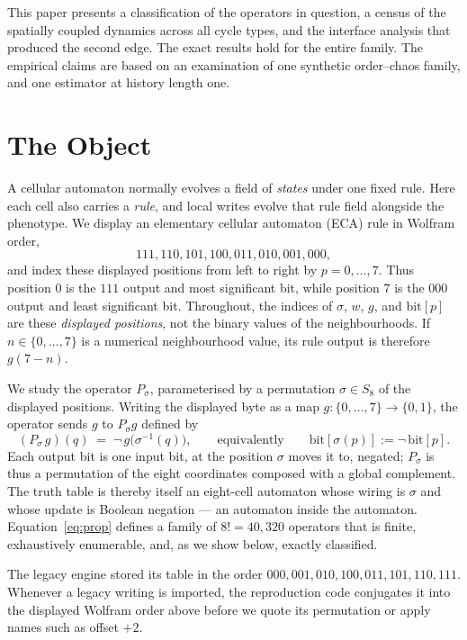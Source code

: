 \documentclass[man,12pt,floatsintext,donotrepeattitle]{apa7}
\newcommand{\sig}{\sigma}
\newcommand{\bit}[1]{\mathrm{bit}[#1]}
\begin{document}
This paper presents a classification of the operators in question, a
census of the spatially coupled dynamics across all cycle types, and
the interface analysis that produced the second edge. The exact
results hold for the entire family. The empirical claims are based on
an examination of one synthetic order--chaos family, and one estimator
at history length one.

\section{The Object}
\label{sec:object}

A cellular automaton normally evolves a field of \emph{states} under one
fixed rule. Here each cell also carries a \emph{rule}, and local writes evolve
that rule field alongside the phenotype. We display an elementary cellular
automaton (ECA) rule in Wolfram order,
\[
111,110,101,100,011,010,001,000,
\]
and index these displayed positions from left to right by $p=0,\ldots,7$.
Thus position $0$ is the $111$ output and most significant bit, while position
$7$ is the $000$ output and least significant bit. Throughout, the indices of
$\sig$, $w$, $g$, and $\bit{p}$ are these \emph{displayed positions}, not the
binary values of the neighbourhoods. If $n\in\{0,\ldots,7\}$ is a numerical
neighbourhood value, its rule output is therefore $g(7-n)$.

We study the operator $P_\sig$, parameterised by a permutation
$\sig\in S_8$ of the displayed positions. Writing the displayed byte as a map
$g\colon\{0,\dots,7\}\to\{0,1\}$, the operator sends $g$ to $P_\sig g$ defined by
\begin{equation}
(P_\sig\, g)(q) \;=\; \lnot\, g\bigl(\sig^{-1}(q)\bigr),
\qquad\text{equivalently}\qquad \bit{\sig(p)} := \lnot\,\bit{p}.
\label{eq:prop}
\end{equation}
Each output bit is one input bit, at the position $\sig$ moves it to, negated;
$P_\sig$ is thus a permutation of the eight coordinates composed with a global
complement. The truth table is thereby itself an eight-cell automaton whose
wiring is $\sig$ and whose update is Boolean negation --- an automaton inside
the automaton. Equation~\eqref{eq:prop} defines a family of $8! = 40{,}320$
operators that is finite, exhaustively enumerable, and, as we show below,
exactly classified.

The legacy engine stored its table in the order
$000,001,010,100,011,101,110,111$. Whenever a legacy writing is imported, the
reproduction code conjugates it into the displayed Wolfram order above before
we quote its permutation or apply names such as offset $+2$.
\end{document}
